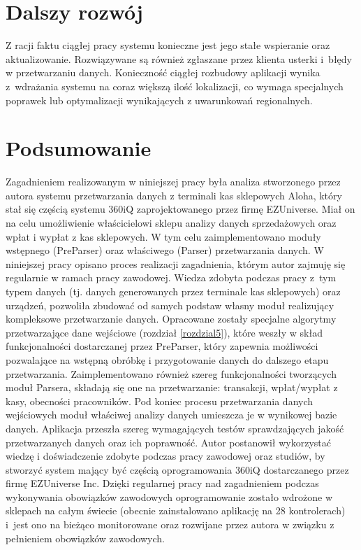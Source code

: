 \documentclass[a4paper]{book}
\begin{document}
\section{Dalszy rozwój}
Z racji faktu ciągłej pracy systemu konieczne jest jego stałe wspieranie oraz aktualizowanie. Rozwiązywane są również zgłaszane przez klienta usterki i~błędy w przetwarzaniu danych. Konieczność ciągłej rozbudowy aplikacji wynika z~wdrażania systemu na coraz większą ilość lokalizacji, co wymaga specjalnych poprawek lub optymalizacji wynikających z uwarunkowań regionalnych.
\section{Podsumowanie}
Zagadnieniem realizowanym w niniejszej pracy była analiza stworzonego przez autora systemu przetwarzania danych z terminali kas sklepowych Aloha, który stał się częścią systemu 360iQ zaprojektowanego przez firmę EZUniverse. Miał on na celu umożliwienie właścicielowi sklepu analizy danych sprzedażowych oraz wpłat i wypłat z kas sklepowych. W tym celu zaimplementowano moduły wstępnego (PreParser) oraz właściwego (Parser) przetwarzania danych.
W niniejszej pracy opisano proces realizacji zagadnienia, którym autor zajmuję się regularnie w ramach pracy zawodowej. Wiedza zdobyta podczas pracy z~tym typem danych (tj. danych generowanych przez terminale kas sklepowych) oraz urządzeń, pozwoliła zbudować od samych podstaw własny moduł realizujący kompleksowe przetwarzanie danych. Opracowane zostały specjalne algorytmy przetwarzające dane wejściowe (rozdział \ref{rozdzial5}), które weszły w skład funkcjonalności dostarczanej przez PreParser, który zapewnia możliwości pozwalające na wstępną obróbkę i przygotowanie danych do dalszego etapu przetwarzania. Zaimplementowano również szereg funkcjonalności tworzących moduł Parsera, składają się one na przetwarzanie: transakcji, wpłat/wypłat z kasy, obecności pracowników. Pod koniec procesu przetwarzania danych wejściowych moduł właściwej analizy danych umieszcza je w wynikowej bazie danych. Aplikacja przeszła szereg wymagających testów sprawdzających jakość przetwarzanych danych oraz ich poprawność. Autor postanowił wykorzystać wiedzę i doświadczenie zdobyte podczas pracy zawodowej oraz studiów, by stworzyć system mający być częścią oprogramowania 360iQ dostarczanego przez firmę EZUniverse Inc. Dzięki regularnej pracy nad zagadnieniem podczas wykonywania obowiązków zawodowych oprogramowanie zostało wdrożone w sklepach na całym świecie (obecnie zainstalowano aplikację na 28 kontrolerach) i~jest ono na bieżąco monitorowane oraz rozwijane przez autora w związku z pełnieniem obowiązków zawodowych.


\end{document}
